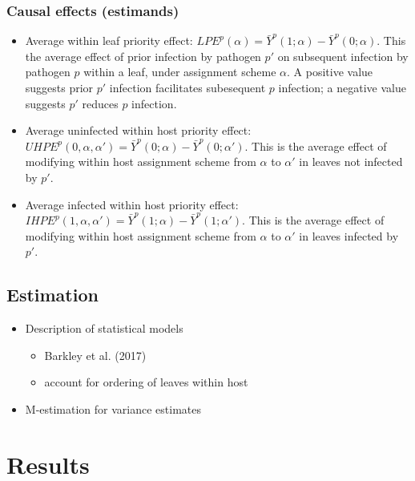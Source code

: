\documentclass[]{article}
\providecommand{\tightlist}{%
  \setlength{\itemsep}{0pt}\setlength{\parskip}{0pt}}
\begin{document}
\hypertarget{causal-effects-estimands}{%
\subsubsection{Causal effects
(estimands)}\label{causal-effects-estimands}}

\begin{itemize}
\tightlist
\item
  Average within leaf priority effect:
  \(LPE^p(\alpha) = \bar{Y}^p(1; \alpha) - \bar{Y}^p(0; \alpha)\). This
  the average effect of prior infection by pathogen \(p'\) on subsequent
  infection by pathogen \(p\) within a leaf, under assignment scheme
  \(\alpha\). A positive value suggests prior \(p'\) infection
  facilitates subesequent \(p\) infection; a negative value suggests
  \(p'\) reduces \(p\) infection.
\item
  Average uninfected within host priority effect:
  \(UHPE^p(0, \alpha, \alpha') = \bar{Y}^p(0; \alpha) - \bar{Y}^p(0; \alpha')\).
  This is the average effect of modifying within host assignment scheme
  from \(\alpha\) to \(\alpha'\) in leaves not infected by \(p'\).
\item
  Average infected within host priority effect:
  \(IHPE^p(1, \alpha, \alpha') = \bar{Y}^p(1; \alpha) - \bar{Y}^p(1; \alpha')\).
  This is the average effect of modifying within host assignment scheme
  from \(\alpha\) to \(\alpha'\) in leaves infected by \(p'\).
\end{itemize}

\hypertarget{estimation}{%
\subsection{Estimation}\label{estimation}}

\begin{itemize}
\tightlist
\item
  Description of statistical models

  \begin{itemize}
  \tightlist
  \item
    Barkley et al. (2017)
  \item
    account for ordering of leaves within host
  \end{itemize}
\item
  M-estimation for variance estimates
\end{itemize}

\hypertarget{results}{%
\section{Results}\label{results}}
\end{document}
